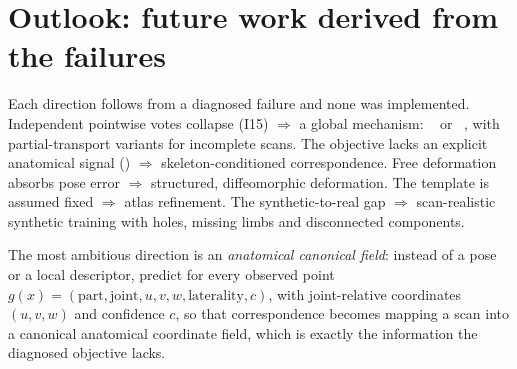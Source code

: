 \section{Outlook: future work derived from the failures}

Each direction follows from a diagnosed failure and none was implemented.
Independent pointwise votes collapse (I15) $\Rightarrow$ a global mechanism:
~\cite{fmaps} or ~\cite{ot},
with partial-transport variants for incomplete scans. The objective lacks an
explicit anatomical signal () $\Rightarrow$ skeleton-conditioned
correspondence. Free deformation absorbs pose error $\Rightarrow$ structured,
diffeomorphic deformation. The template is assumed fixed $\Rightarrow$ atlas
refinement. The synthetic-to-real gap $\Rightarrow$ scan-realistic synthetic
training with holes, missing limbs and disconnected components.

The most ambitious direction is an \emph{anatomical canonical field}: instead
of a pose or a local descriptor, predict for every observed point
$g(x)=(\text{part},\text{joint},u,v,w,\text{laterality},c)$, with
joint-relative coordinates $(u,v,w)$ and confidence $c$, so that
correspondence becomes mapping a scan into a canonical anatomical coordinate
field, which is exactly the information the diagnosed objective lacks.
